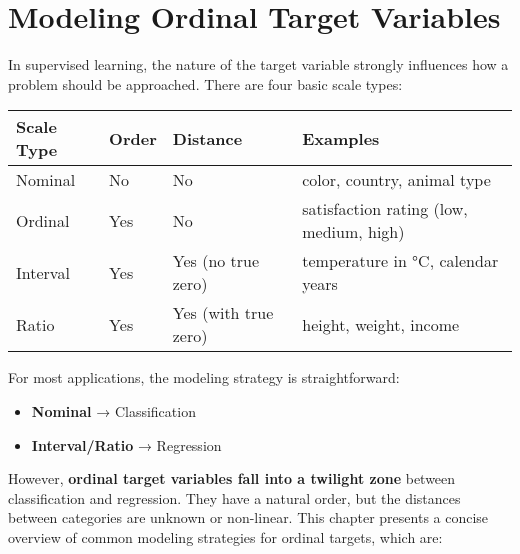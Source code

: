 \documentclass[12pt,openany]{book}
\begin{document}
\chapter{Modeling Ordinal Target Variables}

In supervised learning, the nature of the target variable strongly influences
how a problem should be approached. There are four basic scale types:
\newline

\begin{minipage}{\textwidth}
\centering
\renewcommand{\arraystretch}{1.3} %
\begin{tabular}{m{2.5cm} m{1.5cm} m{4cm} m{7cm}}
\toprule
\textbf{Scale Type} & \textbf{Order} & \textbf{Distance} & \textbf{Examples} \\
\midrule
Nominal   & No  & No  & color, country, animal type \\
Ordinal   & Yes & No  & satisfaction rating (low, medium, high) \\
Interval  & Yes & Yes (no true zero)  & temperature in °C, calendar years \\
Ratio     & Yes & Yes (with true zero) & height, weight, income \\
\bottomrule
\end{tabular}
\end{minipage}
\vspace{5pt}


\vspace{10pt}

For most applications, the modeling strategy is straightforward:
\begin{itemize}
    \item \textbf{Nominal} → Classification
    \item \textbf{Interval/Ratio} → Regression
\end{itemize}

However, \textbf{ordinal target variables fall into a twilight zone} between 
classification and regression. They have a natural order, but the distances 
between categories are unknown or non-linear. This chapter presents a 
concise overview of common modeling strategies for ordinal targets, which are:
\end{document}
